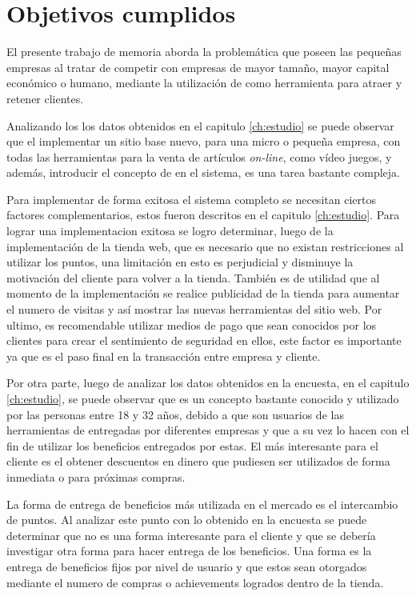 \section{Objetivos cumplidos}

El presente trabajo de memoria aborda la problemática que poseen las pequeñas
empresas al tratar de competir con empresas de mayor tamaño, mayor capital
económico o humano, mediante la utilización de {\GAM} como herramienta para atraer
y retener clientes.

Analizando los los datos obtenidos en el capitulo \ref{ch:estudio} se puede observar que el
implementar un sitio base nuevo, para una micro o pequeña empresa, con todas las
herramientas para la venta de artículos \emph{on-line}, como vídeo juegos, y además,
introducir el concepto de {\GAM} en el sistema, es una tarea bastante compleja.

Para implementar de forma exitosa el sistema completo se necesitan ciertos factores
complementarios, estos fueron descritos en el capitulo \ref{ch:estudio}. Para lograr
una implementacion exitosa se logro determinar, luego de la implementación de la tienda web, 
que es necesario que no existan restricciones al utilizar los puntos, una limitación
en esto es perjudicial y disminuye la motivación del cliente para volver a la tienda. 
También es de utilidad que al momento de la implementación se realice publicidad
de la tienda para aumentar el numero de visitas y así mostrar las nuevas herramientas
del sitio web. Por ultimo, es recomendable utilizar medios de pago que sean conocidos
por los clientes para crear el sentimiento de seguridad en ellos, este factor es importante
ya que es el paso final en la transacción entre empresa y cliente. 

Por otra parte, luego de analizar los datos obtenidos en la encuesta, en el capitulo \ref{ch:estudio},
 se puede observar que {\GAM} es un concepto bastante conocido y utilizado por las personas 
entre 18 y 32 años, debido a que son usuarios de las herramientas de {\GAM} entregadas por
diferentes empresas y que a su vez lo hacen con el fin de utilizar los beneficios entregados 
por estas. El más interesante para el cliente es el obtener descuentos en dinero
que pudiesen ser utilizados de forma inmediata o para próximas compras.

La forma de entrega de beneficios más utilizada en el mercado es el intercambio de puntos. 
Al analizar este punto con lo obtenido en la encuesta se puede determinar que no es 
una forma interesante para el cliente y que se debería investigar otra forma para 
hacer entrega de los beneficios. Una forma es la entrega de beneficios fijos por nivel 
de usuario y que estos sean otorgados mediante el numero de compras o achievements logrados
dentro de la tienda.

